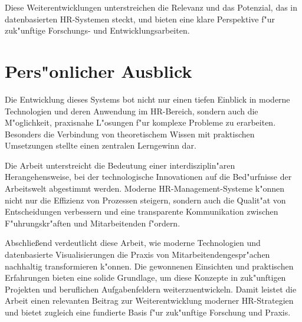 Diese Weiterentwicklungen unterstreichen die Relevanz und das Potenzial, das in datenbasierten HR-Systemen steckt, und bieten eine klare Perspektive f"ur zuk"unftige Forschungs- und Entwicklungsarbeiten.

\section{Pers"onlicher Ausblick}
Die Entwicklung dieses Systems bot nicht nur einen tiefen Einblick in moderne Technologien und deren Anwendung im HR-Bereich, sondern auch die M"oglichkeit, praxisnahe L"osungen f"ur komplexe Probleme zu erarbeiten. Besonders die Verbindung von theoretischem Wissen mit praktischen Umsetzungen stellte einen zentralen Lerngewinn dar.

Die Arbeit unterstreicht die Bedeutung einer interdisziplin"aren Herangehensweise, bei der technologische Innovationen auf die Bed"urfnisse der Arbeitswelt abgestimmt werden. Moderne HR-Management-Systeme k"onnen nicht nur die Effizienz von Prozessen steigern, sondern auch die Qualit"at von Entscheidungen verbessern und eine transparente Kommunikation zwischen F"uhrungskr"aften und Mitarbeitenden f"ordern. 

Abschlie\ss end verdeutlicht diese Arbeit, wie moderne Technologien und datenbasierte Visualisierungen die Praxis von Mitarbeitendengespr"achen nachhaltig transformieren k"onnen. Die gewonnenen Einsichten und praktischen Erfahrungen bieten eine solide Grundlage, um diese Konzepte in zuk"unftigen Projekten und beruflichen Aufgabenfeldern weiterzuentwickeln. Damit leistet die Arbeit einen relevanten Beitrag zur Weiterentwicklung moderner HR-Strategien und bietet zugleich eine fundierte Basis f"ur zuk"unftige Forschung und Praxis.
